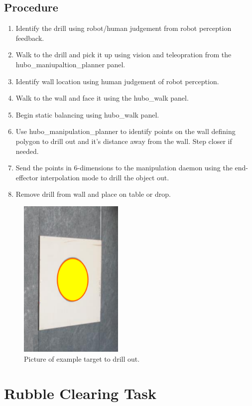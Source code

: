 \documentclass[letterpaper, 10 pt]{report}
\begin{document}
\subsection{Procedure}
\begin{enumerate}
\item Identify the drill using robot/human judgement from robot perception feedback.
\item Walk to the drill and pick it up using vision and teleopration from the hubo\_maniupaltion\_planner panel.
\item Identify wall location using human judgement of robot perception.
\item Walk to the wall and face it using the hubo\_walk panel.
\item Begin static balancing using hubo\_walk panel.
\item Use hubo\_manipulation\_planner to identify points on the wall defining polygon to drill out and it's distance away from the wall. Step closer if needed.
\item Send the points in 6-dimensions to the manipulation daemon using the end-effector interpolation mode to drill the object out.
\item Remove drill from wall and place on table or drop.
\end{enumerate}
\begin{figure}[ht]
  \centering
  \includegraphics[width=5.0cm]{figures/wall-drilling}
  \caption{Picture of example target to drill out.}
  \label{fig:Wall-image}
\end{figure}

\newpage

%
\section{Rubble Clearing Task}\label{sec:rubble-clearing-task}
\end{document}
